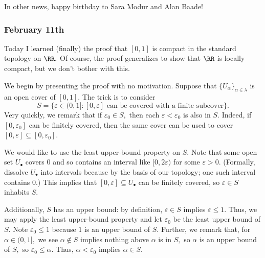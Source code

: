 In other news, happy birthday to Sara Modur and Alan Baade!

\subsubsection{February 11th}
Today I learned (finally) the proof that $[0,1]$ is compact in the standard topology on $\RR.$ Of course, the proof generalizes to show that $\RR$ is locally compact, but we don't bother with this.

We begin by presenting the proof with no motivation. Suppose that $\{U_\alpha\}_{\alpha\in\lambda}$ is an open cover of $[0,1].$ The trick is to consider
\[S=\{\varepsilon\in(0,1]:[0,\varepsilon]\text{ can be covered with a finite subcover}\}.\]
Very quickly, we remark that if $\varepsilon_0\in S,$ then each $\varepsilon<\varepsilon_0$ is also in $S.$ Indeed, if $[0,\varepsilon_0]$ can be finitely covered, then the same cover can be used to cover $[0,\varepsilon]\subseteq[0,\varepsilon_0].$

We would like to use the least upper-bound property on $S.$ Note that some open set $U_\bullet$ covers $0$ and so contains an interval like $[0,2\varepsilon)$ for some $\varepsilon>0.$ (Formally, dissolve $U_\bullet$ into intervals because by the basis of our topology; one such interval contains $0.$) This implies that $[0,\varepsilon]\subseteq U_\bullet$ can be finitely covered, so $\varepsilon\in S$ inhabits $S.$

Additionally, $S$ has an upper bound: by definition, $\varepsilon\in S$ implies $\varepsilon\le1.$ Thus, we may apply the least upper-bound property and let $\varepsilon_0$ be the least upper bound of $S.$ Note $\varepsilon_0\le1$ because $1$ is an upper bound of $S.$ Further, we remark that, for $\alpha\in(0,1],$ we see $\alpha\notin S$ implies nothing above $\alpha$ is in $S,$ so $\alpha$ is an upper bound of $S,$ so $\varepsilon_0\le\alpha.$ Thus, $\alpha<\varepsilon_0$ implies $\alpha\in S.$

